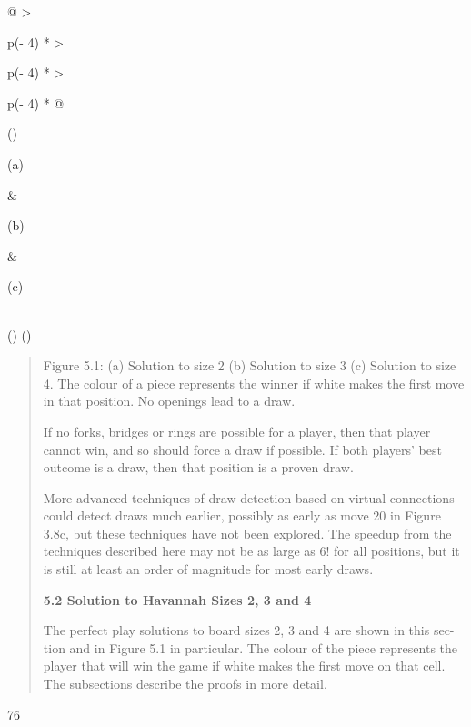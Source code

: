 \documentclass[
]{article}
\begin{document}
\begin{longtable}[]{@{}
  >{\raggedright\arraybackslash}p{(\columnwidth - 4\tabcolsep) * }
  >{\raggedright\arraybackslash}p{(\columnwidth - 4\tabcolsep) * }
  >{\raggedright\arraybackslash}p{(\columnwidth - 4\tabcolsep) * }@{}}
\toprule()
\begin{minipage}[b]{\linewidth}\raggedright
(a)
\end{minipage} & \begin{minipage}[b]{\linewidth}\raggedright
(b)
\end{minipage} & \begin{minipage}[b]{\linewidth}\raggedright
(c)
\end{minipage} \\
\midrule()
\endhead
\bottomrule()
\end{longtable}

\begin{quote}
Figure 5.1: (a) Solution to size 2 (b) Solution to size 3 (c) Solution
to size 4. The colour of a piece represents the winner if white makes
the first move in that position. No openings lead to a draw.

If no forks, bridges or rings are possible for a player, then that
player cannot win, and so should force a draw if possible. If both
players' best outcome is a draw, then that position is a proven draw.

More advanced techniques of draw detection based on virtual connections
could detect draws much earlier, possibly as early as move 20 in Figure
3.8c, but these techniques have not been explored. The speedup from the
techniques described here may not be as large as 6! for all positions,
but it is still at least an order of magnitude for most early draws.

\textbf{5.2 Solution to Havannah Sizes 2, 3 and 4}

The perfect play solutions to board sizes 2, 3 and 4 are shown in this
sec-tion and in Figure 5.1 in particular. The colour of the piece
represents the player that will win the game if white makes the first
move on that cell. The subsections describe the proofs in more detail.
\end{quote}

76
\end{document}

